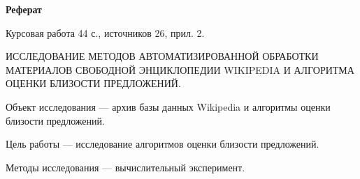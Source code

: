 \begin{center}
	\textbf{Реферат}
\end{center}

      Курсовая работа  44  с., источников  26, прил. 2.

ИССЛЕДОВАНИЕ МЕТОДОВ АВТОМАТИЗИРОВАННОЙ ОБРАБОТКИ МАТЕРИАЛОВ 
СВОБОДНОЙ ЭНЦИКЛОПЕДИИ WIKIPEDIA 
И АЛГОРИТМА ОЦЕНКИ БЛИЗОСТИ ПРЕДЛОЖЕНИЙ.

Объект исследования --- архив базы данных Wikipedia и алгоритмы оценки близости предложений.

Цель работы --- исследование алгоритмов оценки близости предложений.

Методы исследования --- вычислительный эксперимент.
